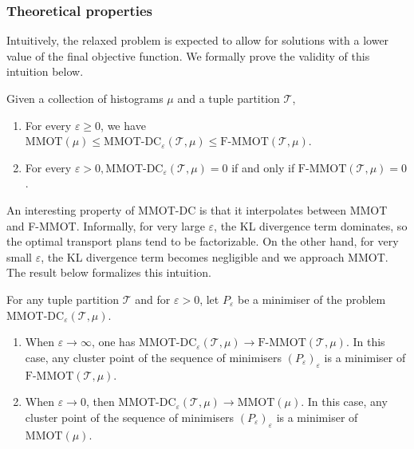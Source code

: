 \subsubsection*{Theoretical properties}
Intuitively, the relaxed problem is expected to allow for solutions with a lower value of the final objective function. We formally prove the validity of this intuition below.
\begin{proposition} \label{MMOT_dc_prop}
  Given a collection of histograms $\mu$ and a tuple partition $\mathcal T$,
  \begin{enumerate}
    \item For every $\varepsilon \geq 0$, we have $\text{MMOT}(\mu) \leq
    \text{MMOT-DC}_{\varepsilon}(\mathcal T, \mu) \leq \text{F-MMOT}( \mathcal T, \mu)$.
    \item For every $\varepsilon > 0, \text{MMOT-DC}_{\varepsilon}( \mathcal T, \mu ) = 0$ if and only if
    $\text{F-MMOT} (\mathcal T, \mu) = 0$.
  \end{enumerate}
\end{proposition}
An interesting property of MMOT-DC is that it interpolates between MMOT and F-MMOT. Informally,
for very large $\varepsilon$, the KL divergence term dominates, so the optimal transport plans tend to be factorizable.
On the other hand, for very small $\varepsilon$, the KL divergence term becomes negligible and we approach MMOT.
The result below formalizes this intuition.
\begin{proposition} \label{interpolation_prop}
  For any tuple partition $\mathcal T$ and for $\varepsilon > 0$,
  let $P_{\varepsilon}$ be a minimiser of the problem $\text{MMOT-DC}_{\varepsilon}(\mathcal T, \mu)$.
  \begin{enumerate}
    \item When $\varepsilon \to \infty$, one has $\text{MMOT-DC}_{\varepsilon}(\mathcal T, \mu) \to
    \text{F-MMOT}(\mathcal T, \mu)$. In this case, any cluster point of the sequence of minimisers
    $(P_{\varepsilon})_{\varepsilon}$ is a minimiser of $\text{F-MMOT}(\mathcal T, \mu)$.

    \item When $\varepsilon \to 0$, then $\text{MMOT-DC}_{\varepsilon}(\mathcal T, \mu) \to \text{MMOT}(\mu)$.
    In this case, any cluster point of the sequence of minimisers $(P_{\varepsilon})_{\varepsilon}$ is a minimiser of
    $\text{MMOT}(\mu)$.
  \end{enumerate}
\end{proposition}
